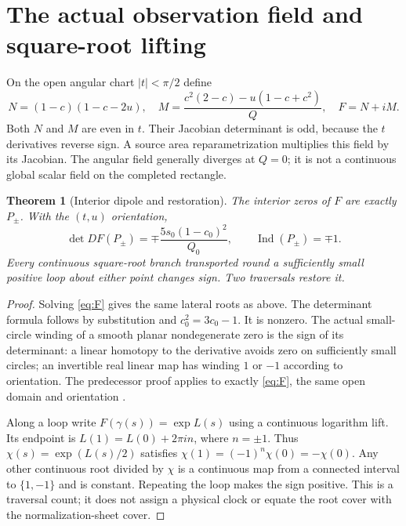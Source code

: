 \documentclass[11pt]{article}
\theoremstyle{readable}
\newtheorem{theorem}{Theorem}[section]
\theoremstyle{remark}\newtheorem{remark}[theorem]{Remark}
\begin{document}
\section{The actual observation field and square-root lifting}\label{sec:field}
On the open angular chart $|t|<\pi/2$ define
\begin{equation}\label{eq:F}
 N=(1-c)(1-c-2u),\quad
 M=\frac{c^2(2-c)-u(1-c+c^2)}{Q},\quad F=N+iM.
\end{equation}
Both $N$ and $M$ are even in $t$. Their Jacobian determinant is odd, because
the $t$ derivatives reverse sign. A source area reparametrization multiplies
this field by its Jacobian. The angular field generally diverges at $Q=0$;
it is not a continuous global scalar field on the completed rectangle.
\begin{theorem}[Interior dipole and restoration]\label{thm:dipole}
The interior zeros of $F$ are exactly $P_\pm$. With the $(t,u)$ orientation,
\[
 \det DF(P_\pm)=\mp\frac{5s_0(1-c_0)^2}{Q_0},\qquad
 \operatorname{Ind}(P_\pm)=\mp1.
\]
Every continuous square-root branch transported round a sufficiently small
positive loop about either point changes sign. Two traversals restore it.
\end{theorem}
\begin{proof}
Solving \eqref{eq:F} gives the same lateral roots as above. The determinant
formula follows by substitution and $c_0^2=3c_0-1$. It is nonzero.
The actual small-circle winding of a smooth planar nondegenerate zero is
the sign of its determinant: a linear homotopy to the derivative avoids zero
on sufficiently small circles; an invertible real linear map has winding
$1$ or $-1$ according to orientation. The predecessor proof applies to
exactly \eqref{eq:F}, the same open domain and orientation \cite{ruled}.

Along a loop write $F(\gamma(s))=\exp L(s)$ using a continuous logarithm
lift. Its endpoint is $L(1)=L(0)+2\pi i n$, where $n=\pm1$. Thus
$\chi(s)=\exp(L(s)/2)$ satisfies $\chi(1)=(-1)^n\chi(0)=-\chi(0)$.
Any other continuous root divided by $\chi$ is a continuous map from a
connected interval to $\{1,-1\}$ and is constant. Repeating the loop makes
the sign positive. This is a traversal count; it does not assign a physical
clock or equate the root cover with the normalization-sheet cover.
\end{proof}
\end{document}
